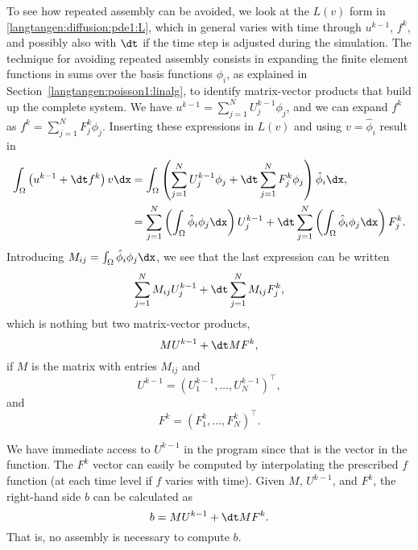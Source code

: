 To see how repeated assembly can be avoided, we look at the $L(v)$
form in \eqref{langtangen:diffusion:pde1:L}, which in general varies
with time through $u^{k-1}$, $f^k$, and possibly also with ${\dt}$
if the time step is adjusted during the simulation.  The technique
for avoiding repeated assembly consists in expanding the finite
element functions in sums over the basis functions $\phi_i$, as
explained in Section~\ref{langtangen:poisson1:linalg}, to identify
matrix-vector products that build up the complete system. We have
$u^{k-1}=\sum_{j=1}^NU^{k-1}_j\phi_j$, and we can expand $f^k$ as
$f^{k}=\sum_{j=1}^NF^{k}_j\phi_j$. Inserting these expressions in $L(v)$
and using $v=\hat\phi_i$ result in
\begin{equation}
\begin{split}
\int_\Omega \left(u^{k-1} + {\dt}f^k\right)v\dx
  &= \int_\Omega \left(\sum_{j=1}^N U^{k-1}_j\phi_j + {\dt}\sum_{j=1}^N F^{k}_j\phi_j\right)\hat\phi_i\dx,
\\
  &=\sum_{j=1}^N\left(\int_\Omega \hat\phi_i\phi_j\dx\right)U^{k-1}_j
 + {\dt}\sum_{j=1}^N\left(\int_\Omega \hat\phi_i\phi_j\dx\right)F^{k}_j.
\end{split}
\end{equation}
Introducing $M_{ij} = \int_\Omega \hat\phi_i\phi_j\dx$, we see that
the last expression can be written
\begin{equation}
  \sum_{j=1}^NM_{ij}U^{k-1}_j + {\dt} \sum_{j=1}^NM_{ij}F^{k}_j,
\end{equation}
which is nothing but two matrix-vector products,
\begin{equation}
   MU^{k-1} + {\dt} MF^k,
\end{equation}
if $M$ is the matrix with entries $M_{ij}$ and
\begin{equation}
  U^{k-1}=(U^{k-1}_1,\ldots,U^{k-1}_N)^{\top},
\end{equation}
and
\begin{equation}
 F^k=(F^{k}_1,\ldots,F^{k}_N)^{\top}.
\end{equation}

We have immediate access to $U^{k-1}$
in the program since that is the vector
in the  function. The $F^k$ vector can easily be
computed by interpolating the prescribed $f$ function (at each time level if
$f$ varies with time). Given $M$, $U^{k-1}$, and $F^k$, the right-hand side
$b$ can be calculated as
\begin{equation}
 b = MU^{k-1} + {\dt} MF^k.
\end{equation}
That is, no assembly is necessary to compute $b$.

